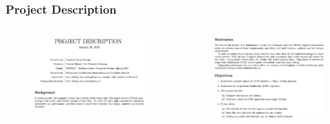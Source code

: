 \documentclass[hyperref={pdfpagelabels=false}, aspectratio=1610]{beamer}
\begin{document}
\begin{frame}
\frametitle{Project Description}
\begin{block}{}
\begin{columns}

\begin{column}{.5\textwidth}
\begin{figure}[htbp]
\centering
\includegraphics[scale=0.2]{fig/p1}
\end{figure}
\end{column}

\begin{column}{.5\textwidth}
\begin{figure}[htbp]
\centering
\includegraphics[scale=0.25]{fig/p2}
\end{figure}
\end{column}

\end{columns}
\end{block}
\end{frame}
\end{document}
